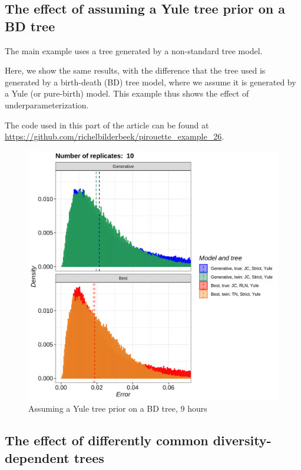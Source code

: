 \subsection{The effect of assuming a Yule tree prior on a BD tree}
\label{subsec:under_parameterization}

The main example uses a tree generated by a non-standard tree model.

Here, we show the same results, with the difference that
the tree used is generated by a birth-death (BD) tree model,
where we assume it is generated by a Yule (or pure-birth) model.
This example thus shows the effect of underparameterization.

The code used in this part of the article can be found at 
\url{https://github.com/richelbilderbeek/pirouette_example_26}.

\begin{figure}[H]
  \includegraphics[width=\textwidth]{pirouette_example_26/errors.png}
  \caption{Assuming a Yule tree prior on a BD tree, 9 hours}
\end{figure}

\subsection{The effect of differently common diversity-dependent trees}
\label{subsec:better_label_needed}

